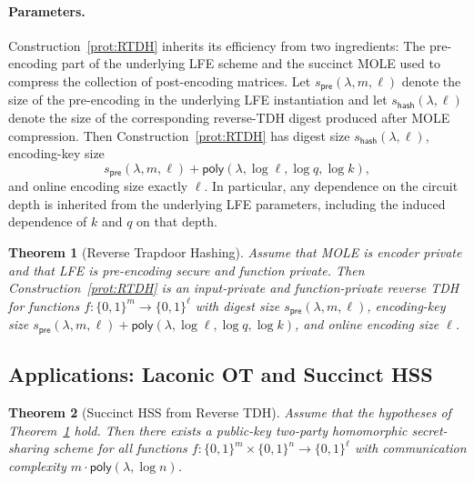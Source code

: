 \documentclass{article}
\newtheorem{theorem}{Theorem}\newtheorem{lemma}[theorem]{Lemma}\newtheorem{proposition}[theorem]{Proposition}\newtheorem{corollary}[theorem]{Corollary}\newtheorem{definition}[theorem]{Definition}\newtheorem{claim}[theorem]{Claim}
\newcommand{\poly}{\mathsf{poly}}
\begin{document}
{\paragraph{Parameters.} Construction~\ref{prot:RTDH}
inherits its efficiency from two ingredients: The pre-encoding part of the
underlying LFE scheme and the succinct MOLE used to compress the collection of
post-encoding matrices. Let
$s_{\mathsf{pre}}(\lambda,m,\ell)$
denote the size of the pre-encoding in the underlying LFE instantiation and let
$s_{\mathsf{hash}}(\lambda,\ell)$
denote the size of the corresponding reverse-TDH digest produced after MOLE
compression. Then Construction~\ref{prot:RTDH} has digest size
$s_{\mathsf{hash}}(\lambda,\ell)$,
encoding-key size
\[
s_{\mathsf{pre}}(\lambda,m,\ell)
+\poly(\lambda,\log \ell,\log q,\log k),
\]
and online encoding size exactly $\ell$. In particular, any dependence on the circuit depth is inherited from the
underlying LFE parameters, including the induced dependence of $k$ and $q$ on
that depth.}

{
\begin{theorem}[Reverse Trapdoor Hashing]\label{thm:reverseTDH}
Assume that MOLE is encoder private and that LFE is pre-encoding secure and
function private. Then Construction~\ref{prot:RTDH} is an input-private
and function-private reverse TDH for functions
$f:\{0,1\}^m\to\{0,1\}^\ell$ with digest size $s_{\mathsf{pre}}(\lambda,m,\ell)$,
encoding-key size
$s_{\mathsf{pre}}(\lambda,m,\ell)
+\poly(\lambda,\log \ell,\log q,\log k)$,
and online encoding size $\ell$.
\end{theorem}}

{\subsection{Applications: Laconic OT and Succinct HSS}}


{\begin{theorem}[Succinct HSS from Reverse TDH]
Assume that the hypotheses of Theorem~\ref{thm:reverseTDH} hold.  Then there exists a
public-key two-party homomorphic secret-sharing scheme for all functions
$f : \{0,1\}^{m} \times \{0,1\}^{n} \to \{0,1\}^{\ell}$
with communication complexity $m \cdot \poly(\lambda,\log n)$.
\end{theorem}}
\end{document}
